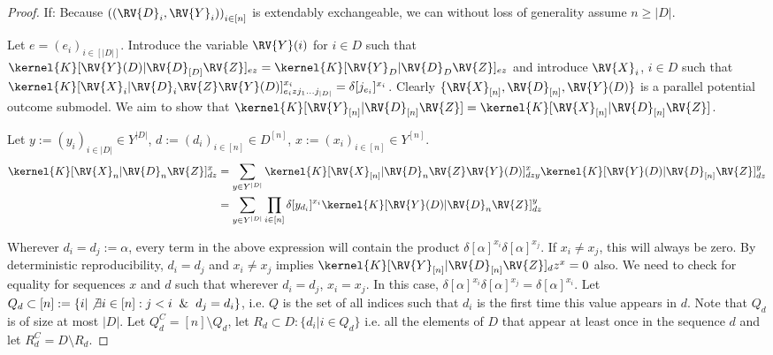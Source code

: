 \begin{proof}
If:
Because $\left((\RV{D}_i,\RV{Y}_i)\right)_{i\in [n]}$ is extendably exchangeable, we can without loss of generality assume $n\geq |D|$.

Let $e=(e_i)_{i\in {[|D|]}}$. Introduce the variable $\RV{Y}(i)$ for $i\in D$ such that $\kernel{K}[\RV{Y}(D)|\RV{D}_{[D]}\RV{Z}]_{ez}=\kernel{K}[\RV{Y}_D|\RV{D}_D \RV{Z}]_{ez}$ and introduce $\RV{X}_i$, $i\in D$ such that $\kernel{K}[\RV{X}_i|\RV{D}_i\RV{Z}\RV{Y}(D)]_{e_izj_1...j_{|D|}}^{x_i} = \delta[j_{e_i}]^{x_i}$. Clearly $\{\RV{X}_{[n]},\RV{D}_{[n]},\RV{Y}(D)\}$ is a parallel potential outcome submodel. We aim to show that $\kernel{K}[\RV{Y}_{[n]}|\RV{D}_{[n]}\RV{Z}]=\kernel{K}[\RV{X}_{[n]}|\RV{D}_{[n]}\RV{Z}]$.

Let $y:=(y_i)_{i\in |D|}\in Y^{|D|}$, $d:=(d_i)_{i\in [n]}\in D^{[n]}$, $x:=(x_i)_{i\in [n]}\in Y^{[n]}$.
\begin{align}
    \kernel{K}[\RV{X}_n|\RV{D}_n\RV{Z}]^x_{dz} &= \sum_{y\in Y^{|D|}} \kernel{K}[\RV{X}_{[n]}|\RV{D}_n\RV{Z}\RV{Y}(D)]_{dzy}^x \kernel{K}[\RV{Y}(D)|\RV{D}_{[n]}\RV{Z}]_{dz}^y\\
                                               &= \sum_{y\in Y^{|D|}} \prod_{i\in [n]} \delta[y_{d_i}]^{x_i} \kernel{K}[\RV{Y}(D)|\RV{D}_n\RV{Z}]_{dz}^y
\end{align}

Wherever $d_i=d_j:=\alpha$, every term in the above expression will contain the product $\delta[\alpha]^{x_i}\delta[\alpha]^{x_j}$. If $x_i\neq x_j$, this will always be zero. By deterministic reproducibility, $d_i=d_j$ and $x_i\neq x_j$ implies $\kernel{K}[\RV{Y}_{[n]}|\RV{D}_{[n]}\RV{Z}]_dz^x=0$ also. We need to check for equality for sequences $x$ and $d$ such that wherever $d_i=d_j$, $x_i=x_j$. In this case, $\delta[\alpha]^{x_i}\delta[\alpha]^{x_j}=\delta[\alpha]^{x_i}$. Let $Q_d\subset[n]:=\{i|\not\exists i\in [n]: j<i \And d_j=d_i\}$, i.e. $Q$ is the set of all indices such that $d_i$ is the first time this value appears in $d$. Note that $Q_d$ is of size at most $|D|$. Let $Q_d^C=[n]\setminus Q_d$, let $R_d\subset D:\{d_i|i\in Q_d\}$ i.e. all the elements of $D$ that appear at least once in the sequence $d$ and let $R^C_d=D\setminus R_d$. 


\end{proof}
